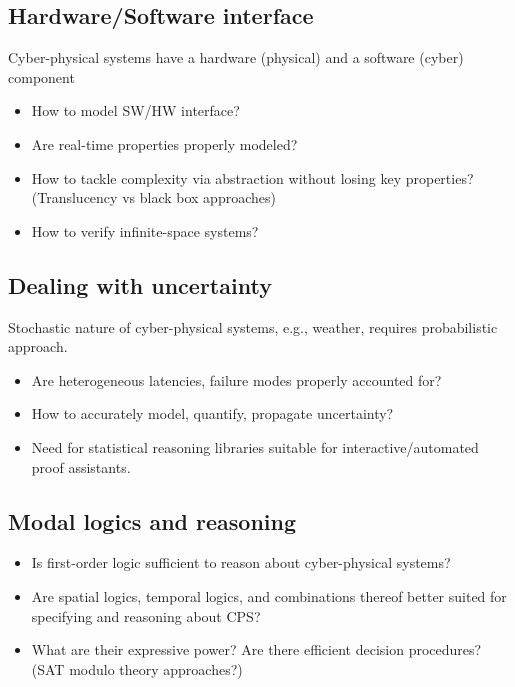 \documentclass[
graybox,
envcountchap
]{svmult}
\begin{document}
\begin{bibunit}
    \subsection{Hardware/Software interface}

    Cyber-physical systems have a hardware (physical) and a software (cyber) component
    
    \begin{itemize}
    \item How to model SW/HW interface?
    \item Are real-time properties properly modeled?
    \item  How to tackle complexity via abstraction without losing key properties?  (Translucency vs black box approaches)
    \item How to verify infinite-space systems?
    \end{itemize}

    \subsection{Dealing with uncertainty}

    Stochastic nature of cyber-physical systems, e.g., weather, requires probabilistic approach.
    
    \begin{itemize}
    \item Are heterogeneous latencies, failure modes properly accounted for?
    \item How to accurately model, quantify, propagate uncertainty?
    \item Need for statistical reasoning libraries suitable for interactive/automated proof assistants.
    \end{itemize}

    \subsection{Modal logics and reasoning}
    
    \begin{itemize}
    \item  Is first-order logic sufficient to reason about cyber-physical systems?
    \item Are spatial logics, temporal logics, and combinations thereof better suited for specifying and reasoning about CPS?
    \item What are their expressive power?   Are there efficient decision procedures?  (SAT modulo theory approaches?)
    \end{itemize}


\end{bibunit}
\end{document}
